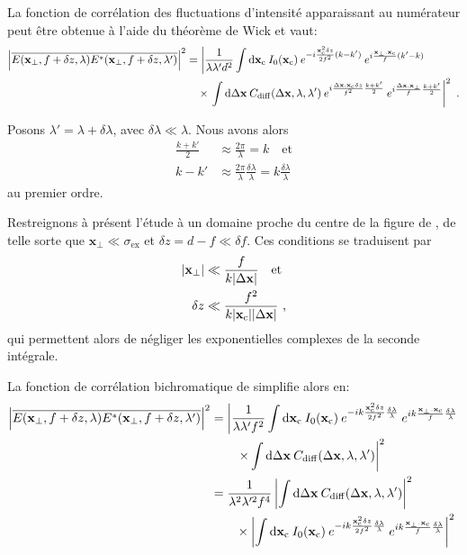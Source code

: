 La fonction de corrélation des fluctuations d'intensité apparaissant au numérateur peut être obtenue à l'aide du théorème de Wick et vaut:
\begin{align}
\left| \overline{E(\mathbf{x}_{\perp},f+\delta z,\lambda)E^*(\mathbf{x}_{\perp},f+\delta z,\lambda')} \right|^2 &= \left| \frac{1}{\lambda\lambda' d^2} \int{\mathop{}\mathopen{}\mathrm{d}\mathbf{x}_{\mathrm{c}}\: I_0(\mathbf{x}_{\mathrm{c}}) \: e^{-i\frac{\mathbf{x}_{\mathrm{c}}^2 \delta z}{2f^2}(k-k')} \: e^{i \frac{\mathbf{x}_{\perp}.\mathbf{x}_{\mathrm{c}}}{f}(k'-k)}}\right. \\
&\nonumber \quad\times \left. \int{\mathop{}\mathopen{}\mathrm{d}\Delta\mathbf{x}\: C_{\mathrm{diff}}(\Delta\mathbf{x}, \lambda, \lambda')\: e^{i \frac{\Delta\mathbf{x}.\mathbf{x}_{\mathrm{c}}\delta z}{f^2}\frac{k+k'}{2}} \: e^{i\frac{\Delta\mathbf{x}.\mathbf{x}_{\perp}}{f}\frac{k+k'}{2}}}\right|^2 \text{ .}
\end{align}

Posons $\lambda'=\lambda+\delta\lambda$, avec $\delta\lambda\ll\lambda$. Nous avons alors
\begin{align}
\frac{k+k'}{2} &\approx \frac{2\pi}{\lambda} =k \quad \text{et}\\
k-k' &\approx \frac{2\pi}{\lambda} \frac{\delta\lambda}{\lambda} = k \frac{\delta\lambda}{\lambda}
\end{align}
au premier ordre.

Restreignons à présent l'étude à un domaine proche du centre de la figure de \speckle , de telle sorte que $\mathbf{x}_{\perp}\ll\sigma_{\mathrm{ex}}$ et $\delta z=d-f \ll \delta f$. Ces conditions se traduisent par 
\begin{align}
|\mathbf{x}_{\perp}| &\ll \frac{f}{k |\Delta\mathbf{x}|}  \quad\text{et}\\
\delta z &\ll \frac{f^2}{k|\mathbf{x}_{\mathrm{c}}||\Delta\mathbf{x}|} \text{ ,}
\end{align}
qui permettent alors de négliger les exponentielles complexes de la seconde intégrale.

La fonction de corrélation bichromatique de simplifie alors en:
\begin{align}
\left| \overline{E(\mathbf{x}_{\perp},f+\delta z,\lambda)E^*(\mathbf{x}_{\perp},f+\delta z,\lambda')} \right|^2 &= \left| \frac{1}{\lambda \lambda' f^2} \int{\mathop{}\mathopen{}\mathrm{d}\mathbf{x}_{\mathrm{c}}\: I_0(\mathbf{x}_{\mathrm{c}}) \: e^{-ik\frac{\mathbf{x}_{\mathrm{c}}^2 \delta z}{2f^2} \frac{\delta\lambda}{\lambda}} \: e^{ik \frac{\mathbf{x}_{\perp}.\mathbf{x}_{\mathrm{c}}}{f}\frac{\delta\lambda}{\lambda}}} \right. \\
\nonumber & \qquad \left. \times \int{\mathop{}\mathopen{}\mathrm{d}\Delta\mathbf{x}\: C_{\mathrm{diff}}(\Delta\mathbf{x},\lambda,\lambda')} \right|^2 \\
&= \frac{1}{\lambda^2 \lambda'^2 f^4} \left| \int{\mathop{}\mathopen{}\mathrm{d}\Delta\mathbf{x}\: C_{\mathrm{diff}}(\Delta\mathbf{x},\lambda,\lambda')} \right|^2 \\
\nonumber & \qquad \times\left|\int{\mathop{}\mathopen{}\mathrm{d}\mathbf{x}_{\mathrm{c}}\: I_0(\mathbf{x}_{\mathrm{c}}) \: e^{-ik\frac{\mathbf{x}_{\mathrm{c}}^2 \delta z}{2f^2} \frac{\delta\lambda}{\lambda}} \: e^{ik\frac{\mathbf{x}_{\perp}.\mathbf{x}_{\mathrm{c}}}{f}\frac{\delta\lambda}{\lambda}}} \right|^2
\end{align}

